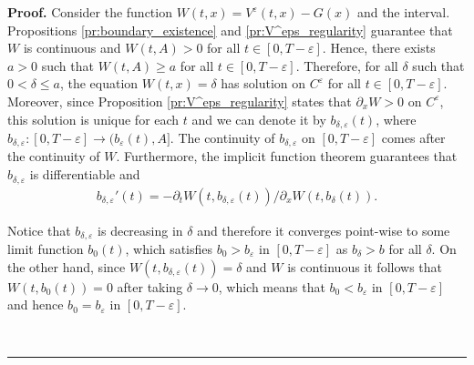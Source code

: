 \documentclass{tufte-handout}
\newenvironment{pf}[1][Proof]{\textbf{#1.} }{\ \rule{0.5em}{0.5em}}
\begin{document}
	\begin{pf}
		Consider the function $W(t, x) = V^\varepsilon(t, x) - G(x)$ and the interval. Propositions \ref{pr:boundary_existence} and \ref{pr:V^eps_regularity} guarantee that $W$ is continuous and $W(t, A) > 0$ for all $t\in [0, T - \varepsilon]$. Hence, there exists $a > 0$ such that $W(t, A) \geq a$ for all $t\in [0, T - \varepsilon]$. Therefore, for all $\delta$ such that $0 < \delta \leq a$, the equation $W(t, x) = \delta$ has solution on $C^\varepsilon$ for all $t\in [0, T - \varepsilon]$. Moreover, since Proposition \ref{pr:V^eps_regularity} states that $\partial_x W > 0$ on $C^\varepsilon$, this solution is unique for each $t$ and we can denote it by $b_{\delta, \varepsilon}(t)$, where  $b_{\delta, \varepsilon}:[0, T - \varepsilon]\rightarrow (b_\varepsilon(t), A]$. The continuity of $b_{\delta, \varepsilon}$ on $[0, T - \varepsilon]$ comes after the continuity of $W$. Furthermore, the implicit function theorem guarantees that $b_{\delta, \varepsilon}$ is differentiable and  
		\begin{align}\label{eq:b_delta'}
		b_{\delta, \varepsilon}'(t) = -\partial_t W(t, b_{\delta, \varepsilon}(t)) / \partial_x W(t, b_\delta(t)).
		\end{align}
		
		Notice that $b_{\delta, \varepsilon}$ is decreasing in $\delta$ and therefore it converges point-wise to some limit function $b_0(t)$, which satisfies $b_0 > b_\varepsilon$ in $[0, T - \varepsilon]$ as $b_\delta > b$ for all $\delta$. On the other hand, since $W(t, b_{\delta, \varepsilon}(t)) = \delta$ and $W$ is continuous it follows that $W(t, b_0(t)) = 0$ after taking $\delta\rightarrow 0$, which means that $b_0 < b_\varepsilon$ in $[0, T - \varepsilon]$ and hence $b_0 = b_\varepsilon$ in $[0, T - \varepsilon]$.
		

\end{pf}
\end{document}
